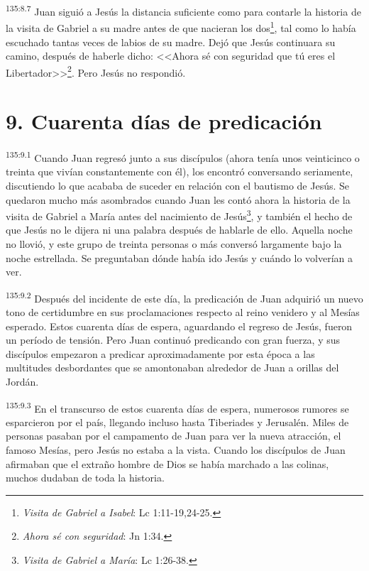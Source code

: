 \par 
\textsuperscript{135:8.7} Juan siguió a Jesús la distancia suficiente como para contarle la historia de la visita de Gabriel a su madre antes de que nacieran los dos\footnote{\textit{Visita de Gabriel a Isabel}: Lc 1:11-19,24-25.}, tal como lo había escuchado tantas veces de labios de su madre. Dejó que Jesús continuara su camino, después de haberle dicho: <<Ahora sé con seguridad que tú eres el Libertador>>\footnote{\textit{Ahora sé con seguridad}: Jn 1:34.}. Pero Jesús no respondió.

\section*{9. Cuarenta días de predicación}
\par 
\textsuperscript{135:9.1} Cuando Juan regresó junto a sus discípulos (ahora tenía unos veinticinco o treinta que vivían constantemente con él), los encontró conversando seriamente, discutiendo lo que acababa de suceder en relación con el bautismo de Jesús. Se quedaron mucho más asombrados cuando Juan les contó ahora la historia de la visita de Gabriel a María antes del nacimiento de Jesús\footnote{\textit{Visita de Gabriel a María}: Lc 1:26-38.}, y también el hecho de que Jesús no le dijera ni una palabra después de hablarle de ello. Aquella noche no llovió, y este grupo de treinta personas o más conversó largamente bajo la noche estrellada. Se preguntaban dónde había ido Jesús y cuándo lo volverían a ver.

\par 
\textsuperscript{135:9.2} Después del incidente de este día, la predicación de Juan adquirió un nuevo tono de certidumbre en sus proclamaciones respecto al reino venidero y al Mesías esperado. Estos cuarenta días de espera, aguardando el regreso de Jesús, fueron un período de tensión. Pero Juan continuó predicando con gran fuerza, y sus discípulos empezaron a predicar aproximadamente por esta época a las multitudes desbordantes que se amontonaban alrededor de Juan a orillas del Jordán.

\par 
\textsuperscript{135:9.3} En el transcurso de estos cuarenta días de espera, numerosos rumores se esparcieron por el país, llegando incluso hasta Tiberiades y Jerusalén. Miles de personas pasaban por el campamento de Juan para ver la nueva atracción, el famoso Mesías, pero Jesús no estaba a la vista. Cuando los discípulos de Juan afirmaban que el extraño hombre de Dios se había marchado a las colinas, muchos dudaban de toda la historia.

